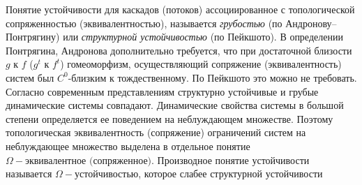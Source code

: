 \noindent Понятие устойчивости для каскадов (потоков) ассоциированное с топологической сопряженностью (эквивалентностью), 
называется \textit{грубостью} (по Андронову--Понтрягину) или \textit{структурной устойчивостью} (по Пейкшото). 
В определении Понтрягина, Андронова дополнительно требуется, что при достаточной близости \(g\) к \(f\) (\(g^t\) к \(f^t\))
гомеоморфизм, осуществляющий сопряжение (эквивалентность) систем был \(C^0\)-близким к тождественному. По Пейкшото это можно
не требовать. Согласно современным представлениям структурно устойчивые и грубые динамические системы совпадают. 
\newpage
\noindent Динамические свойства системы в большой степени определяется ее поведением на неблуждающем множестве. Поэтому 
топологическая эквивалентность (сопряжение) ограничений систем на неблуждающее множество выделена в отдельное 
понятие \textit{\(\Omega - \text{эквивалентное (сопряженное)}\)}. 
Производное понятие устойчивости называется \textit{\(\Omega - \text{устойчивостью}\)}, которое слабее структурной устойчивости
 